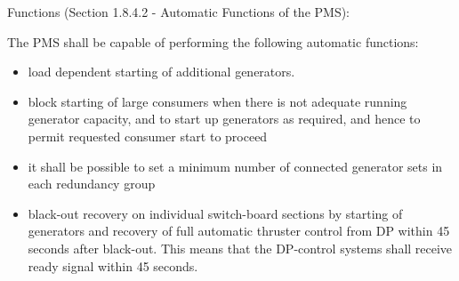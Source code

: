 Functions (Section 1.8.4.2 - Automatic Functions of the PMS):

The PMS shall be capable of performing the following automatic functions:


\begin{itemize}
    \item load dependent starting of additional generators.
    \item block starting of large consumers when there is not adequate running generator capacity, and to start up generators as required, and hence to permit requested consumer start to proceed
    \item it shall be possible to set a minimum number of connected generator sets in each redundancy group
    \item black-out recovery on individual switch-board sections by starting of generators and recovery of full automatic thruster control from DP within 45 seconds after black-out. This means that the DP-control systems shall receive ready signal within 45 seconds.
\end{itemize}